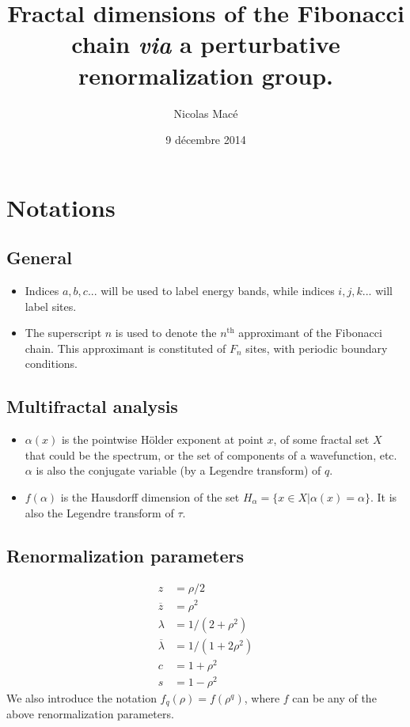 \documentclass[11pt]{article}
\title{\textbf{Fractal dimensions of the Fibonacci chain \emph{via} a perturbative renormalization group.}}
\author{Nicolas Macé}
\date{9 décembre 2014}
\newcommand{\lb}{\ensuremath{\lambda}}
\newcommand{\lbbar}{\ensuremath{\overline{\lambda}}}
\newcommand{\zbar}{\ensuremath{\overline{z}}}
\begin{document}

\maketitle

\section{Notations}

\subsection{General}
\begin{itemize}
	\item Indices $a,b,c...$ will be used to label energy bands, while indices $i,j,k...$ will label sites.
	\item The superscript $n$ is used to denote the $n^\text{th}$ approximant of the Fibonacci chain. This approximant is constituted of $F_n$ sites, with periodic boundary conditions.
\end{itemize}

\subsection{Multifractal analysis}
\begin{itemize}
	\item $\alpha(x)$ is the pointwise Hölder exponent at point $x$, of some fractal set $X$ that could be the spectrum, or the set of components of a wavefunction, etc. $\alpha$ is also the conjugate variable (by a Legendre transform) of $q$. 
	\item $f(\alpha)$ is the Hausdorff dimension of the set $H_\alpha = \{ x \in X | \alpha(x) = \alpha \}$. It is also the Legendre transform of $\tau$.
\end{itemize}

\subsection{Renormalization parameters}
\begin{align}
	z &= \rho/2\\
	\zbar &= \rho^2\\
	\lb &= 1/(2+\rho^2)\\
	\lbbar &= 1/(1+2\rho^2)\\
	c &= 1+\rho^2 \\
	s &= 1-\rho^2
\end{align}
We also introduce the notation $f_q(\rho) = f(\rho^q)$, where $f$ can be any of the above renormalization parameters.
\end{document}
